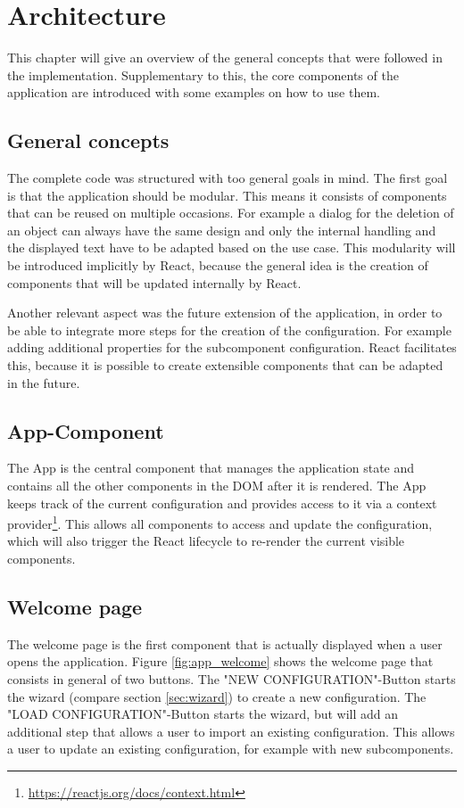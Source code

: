\chapter{Architecture}
\label{sec:architecture}
This chapter will give an overview of the general concepts that were followed in the implementation. Supplementary to this, the core components of the application are introduced with some examples on how to use them.

\section{General concepts}
The complete code was structured with too general goals in mind. The first goal is that the application should be modular. This means it consists of components that can be reused on multiple occasions. For example a dialog for the deletion of an object can always have the same design and only the internal handling and the displayed text have to be adapted based on the use case. This modularity will be introduced implicitly by React, because the general idea is the creation of components that will be updated internally by React.

Another relevant aspect was the future extension of the application, in order to be able to integrate more steps for the creation of the configuration. For example adding additional properties for the subcomponent configuration. React facilitates this, because it is possible to create extensible components that can be adapted in the future.

\section{App-Component}
The App is the central component that manages the application state and contains all the other components in the DOM after it is rendered. The App keeps track of the current configuration and provides access to it via a context provider\footnote{\url{https://reactjs.org/docs/context.html}}. This allows all components to access and update the configuration, which will also trigger the React lifecycle to re-render the current visible components.

\section{Welcome page}
The welcome page is the first component that is actually displayed when a user opens the application. Figure \ref{fig:app_welcome} shows the welcome page that consists in general of two buttons. The "NEW CONFIGURATION"-Button starts the wizard (compare section \ref{sec:wizard}) to create a new configuration. The "LOAD CONFIGURATION"-Button starts the wizard, but will add an additional step that allows a user to import an existing configuration. This allows a user to update an existing configuration, for example with new subcomponents.

